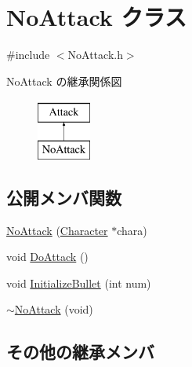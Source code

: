 \hypertarget{class_no_attack}{\section{No\+Attack クラス}
\label{class_no_attack}
}


{\ttfamily \#include $<$No\+Attack.\+h$>$}

No\+Attack の継承関係図\begin{figure}[H]
\begin{center}
\leavevmode
\includegraphics[height=2.000000cm]{class_no_attack}
\end{center}
\end{figure}
\subsection*{公開メンバ関数}
\begin{DoxyCompactItemize}
\item 
\hyperlink{class_no_attack_a2835d4b513feaaedf654abbd0dabe210}{No\+Attack} (\hyperlink{class_character}{Character} $\ast$chara)
\item 
void \hyperlink{class_no_attack_a42e89327c50ecc690056bf5c605a898b}{Do\+Attack} ()
\item 
void \hyperlink{class_no_attack_a183ab68341fef13f86ea3ef020a53546}{Initialize\+Bullet} (int num)
\item 
\hyperlink{class_no_attack_aec116619d17b704addb41a844062dacd}{$\sim$\+No\+Attack} (void)
\end{DoxyCompactItemize}
\subsection*{その他の継承メンバ}


